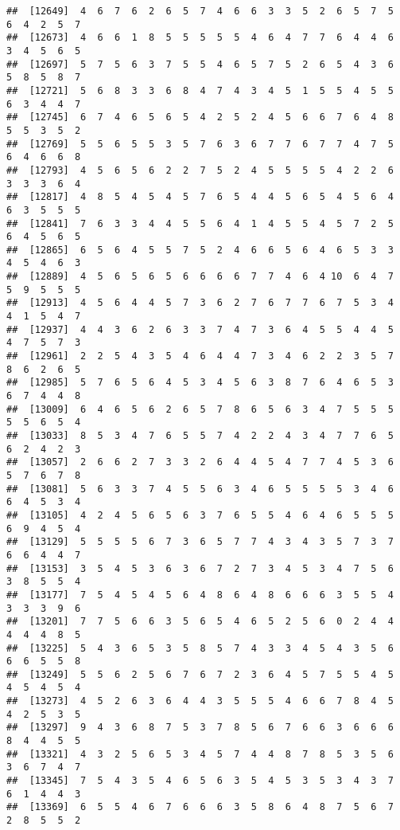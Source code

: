 \documentclass[
]{book}
\begin{document}
\begin{verbatim}
##  [12649]  4  6  7  6  2  6  5  7  4  6  6  3  3  5  2  6  5  7  5  6  4  2  5  7
##  [12673]  4  6  6  1  8  5  5  5  5  5  4  6  4  7  7  6  4  4  6  3  4  5  6  5
##  [12697]  5  7  5  6  3  7  5  5  4  6  5  7  5  2  6  5  4  3  6  5  8  5  8  7
##  [12721]  5  6  8  3  3  6  8  4  7  4  3  4  5  1  5  5  4  5  5  6  3  4  4  7
##  [12745]  6  7  4  6  5  6  5  4  2  5  2  4  5  6  6  7  6  4  8  5  5  3  5  2
##  [12769]  5  5  6  5  5  3  5  7  6  3  6  7  7  6  7  7  4  7  5  6  4  6  6  8
##  [12793]  4  5  6  5  6  2  2  7  5  2  4  5  5  5  5  4  2  2  6  3  3  3  6  4
##  [12817]  4  8  5  4  5  4  5  7  6  5  4  4  5  6  5  4  5  6  4  6  3  5  5  5
##  [12841]  7  6  3  3  4  4  5  5  6  4  1  4  5  5  4  5  7  2  5  6  4  5  6  5
##  [12865]  6  5  6  4  5  5  7  5  2  4  6  6  5  6  4  6  5  3  3  4  5  4  6  3
##  [12889]  4  5  6  5  6  5  6  6  6  6  7  7  4  6  4 10  6  4  7  5  9  5  5  5
##  [12913]  4  5  6  4  4  5  7  3  6  2  7  6  7  7  6  7  5  3  4  4  1  5  4  7
##  [12937]  4  4  3  6  2  6  3  3  7  4  7  3  6  4  5  5  4  4  5  4  7  5  7  3
##  [12961]  2  2  5  4  3  5  4  6  4  4  7  3  4  6  2  2  3  5  7  8  6  2  6  5
##  [12985]  5  7  6  5  6  4  5  3  4  5  6  3  8  7  6  4  6  5  3  6  7  4  4  8
##  [13009]  6  4  6  5  6  2  6  5  7  8  6  5  6  3  4  7  5  5  5  5  5  6  5  4
##  [13033]  8  5  3  4  7  6  5  5  7  4  2  2  4  3  4  7  7  6  5  6  2  4  2  3
##  [13057]  2  6  6  2  7  3  3  2  6  4  4  5  4  7  7  4  5  3  6  5  7  6  7  8
##  [13081]  5  6  3  3  7  4  5  5  6  3  4  6  5  5  5  5  3  4  6  6  4  5  3  4
##  [13105]  4  2  4  5  6  5  6  3  7  6  5  5  4  6  4  6  5  5  5  6  9  4  5  4
##  [13129]  5  5  5  5  6  7  3  6  5  7  7  4  3  4  3  5  7  3  7  6  6  4  4  7
##  [13153]  3  5  4  5  3  6  3  6  7  2  7  3  4  5  3  4  7  5  6  3  8  5  5  4
##  [13177]  7  5  4  5  4  5  6  4  8  6  4  8  6  6  6  3  5  5  4  3  3  3  9  6
##  [13201]  7  7  5  6  6  3  5  6  5  4  6  5  2  5  6  0  2  4  4  4  4  4  8  5
##  [13225]  5  4  3  6  5  3  5  8  5  7  4  3  3  4  5  4  3  5  6  6  6  5  5  8
##  [13249]  5  5  6  2  5  6  7  6  7  2  3  6  4  5  7  5  5  4  5  4  5  4  5  4
##  [13273]  4  5  2  6  3  6  4  4  3  5  5  5  4  6  6  7  8  4  5  4  2  5  3  5
##  [13297]  9  4  3  6  8  7  5  3  7  8  5  6  7  6  6  3  6  6  6  8  4  4  5  5
##  [13321]  4  3  2  5  6  5  3  4  5  7  4  4  8  7  8  5  3  5  6  3  6  7  4  7
##  [13345]  7  5  4  3  5  4  6  5  6  3  5  4  5  3  5  3  4  3  7  6  1  4  4  3
##  [13369]  6  5  5  4  6  7  6  6  6  3  5  8  6  4  8  7  5  6  7  2  8  5  5  2

\end{verbatim}
\end{document}
